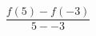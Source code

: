 \documentclass[preview]{standalone}
\begin{document}
\begin{align*}
\dfrac{f(5) - f(-3)}{5 - -3}
\end{align*}
\end{document}
